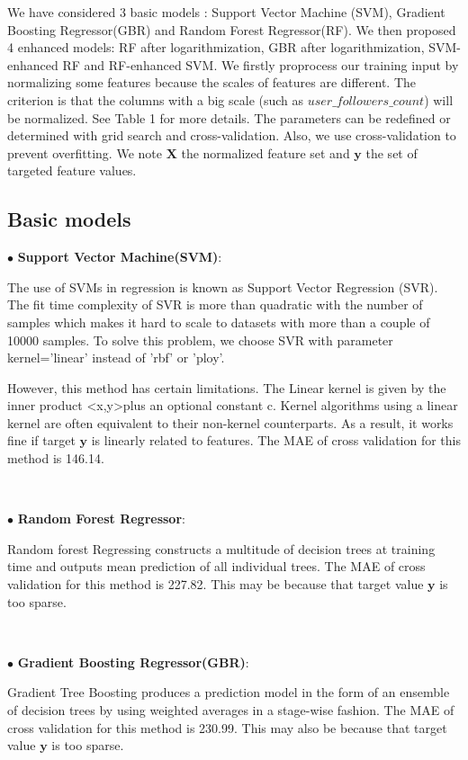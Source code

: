 We have considered 3 basic models : Support Vector Machine (SVM), Gradient Boosting Regressor(GBR) and Random Forest Regressor(RF). We then proposed 4 enhanced models: RF after logarithmization, GBR after logarithmization, SVM-enhanced RF and RF-enhanced SVM. We firstly proprocess our training input by normalizing some features because the scales of features are different. The criterion is that the columns with a big scale (such as $user\_followers\_count$) will be normalized. See Table 1 for more details. The parameters can be redefined or determined with grid search and cross-validation. Also, we use cross-validation to prevent overfitting. We note $\textbf{X}$ the normalized feature set and $\textbf{y}$ the set of targeted feature values.

\subsection*{Basic models}

$\bullet$ \textbf{Support Vector Machine(SVM)}:

The use of SVMs in regression is known as Support Vector Regression (SVR). The fit time complexity of SVR is more than quadratic with the number of samples which makes it hard to scale to datasets with more than a couple of 10000 samples. To solve this problem, we choose SVR with parameter kernel=’linear’ instead of 'rbf' or 'ploy'.

However, this method has certain limitations. The Linear kernel is given by the inner product  \textless x,y\textgreater plus an optional constant c. Kernel algorithms using a linear kernel are often equivalent to their non-kernel counterparts. As a result, it works fine if target $\textbf{y}$ is linearly related to features. The MAE of cross validation for this method is 146.14.

\

$\bullet$ \textbf{Random Forest Regressor}:

Random forest Regressing constructs a multitude of decision trees at training time and outputs mean prediction of all individual trees. The MAE of cross validation for this method is 227.82. This may be because that target value $\textbf{y}$ is too sparse.

\

$\bullet$ \textbf{Gradient Boosting Regressor(GBR)}:

Gradient Tree Boosting  produces a prediction model in the form of an ensemble of decision trees by using weighted averages in a stage-wise fashion.
The MAE of cross validation for this method is 230.99. This may also be because that target value $\textbf{y}$ is too sparse.



